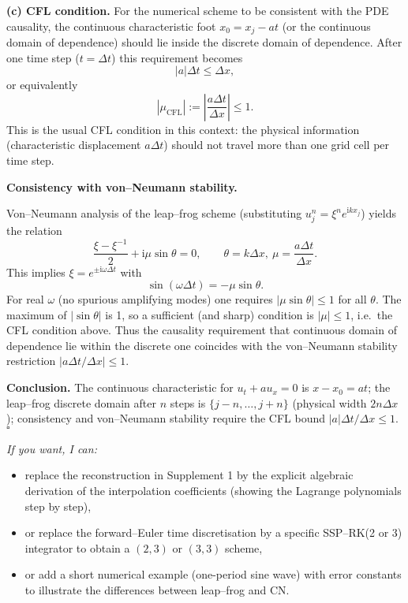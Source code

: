 \documentclass[11pt]{article}
\begin{document}
\medskip

\textbf{(c) CFL condition.}
For the numerical scheme to be consistent with the PDE causality, the continuous characteristic foot \(x_0=x_j - a t\) (or the continuous domain of dependence) should lie inside the discrete domain of dependence. After one time step (\(t=\Delta t\)) this requirement becomes
\[
|a|\Delta t \le \Delta x,
\]
or equivalently
\[
|\mu_{\mathrm{CFL}}| := \left|\frac{a\Delta t}{\Delta x}\right| \le 1.
\]
This is the usual CFL condition in this context: the physical information (characteristic displacement \(a\Delta t\)) should not travel more than one grid cell per time step.

\medskip

\textbf{Consistency with von–Neumann stability.}

Von–Neumann analysis of the leap–frog scheme (substituting \(u_j^n=\xi^n e^{\mathrm{i}k x_j}\)) yields the relation
\[
\frac{\xi - \xi^{-1}}{2} + \mathrm{i}\mu\sin\theta = 0,\qquad \theta=k\Delta x,\ \mu=\frac{a\Delta t}{\Delta x}.
\]
This implies \(\xi = e^{\pm \mathrm{i}\omega\Delta t}\) with
\[
\sin(\omega\Delta t) = -\mu \sin\theta.
\]
For real \(\omega\) (no spurious amplifying modes) one requires \(|\mu \sin\theta|\le 1\) for all \(\theta\). The maximum of \(|\sin\theta|\) is 1, so a sufficient (and sharp) condition is \(|\mu|\le 1\), i.e.\ the CFL condition above. Thus the causality requirement that continuous domain of dependence lie within the discrete one coincides with the von–Neumann stability restriction \(|a\Delta t/\Delta x|\le1\).

\medskip

\textbf{Conclusion.} The continuous characteristic for \(u_t+au_x=0\) is \(x-x_0=at\); the leap–frog discrete domain after \(n\) steps is \(\{j-n,\dots,j+n\}\) (physical width \(2n\Delta x\)); consistency and von–Neumann stability require the CFL bound \(|a|\Delta t/\Delta x\le1\). \(\square\)

\vspace{2em}

\noindent\textit{If you want, I can:}
\begin{itemize}
  \item replace the reconstruction in Supplement 1 by the explicit algebraic derivation of the interpolation coefficients (showing the Lagrange polynomials step by step),
  \item or replace the forward–Euler time discretisation by a specific SSP–RK(2 or 3) integrator to obtain a \((2,3)\) or \((3,3)\) scheme,
  \item or add a short numerical example (one-period sine wave) with error constants to illustrate the differences between leap–frog and CN.
\end{itemize}
\end{document}
